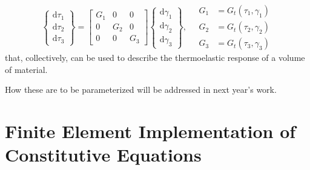 \begin{displaymath}
    \left\{ \begin{matrix}
    \mathrm{d} \tau_1 \\ \mathrm{d} \tau_2 \\ \mathrm{d} \tau_3
    \end{matrix} \right\} = \begin{bmatrix}
    G_1 & 0 & 0 \\ 0 & G_2 & 0 \\ 0 & 0 & G_3
    \end{bmatrix} \left\{ \begin{matrix}
    \mathrm{d} \gamma_1 \\ \mathrm{d} \gamma_2 \\ \mathrm{d} \gamma_3
    \end{matrix} \right\} , \quad
    \begin{aligned}
    G_1 & = G_t ( \tau_1 , \gamma_1 ) \\
    G_2 & = G_t ( \tau_2 , \gamma_2 ) \\
    G_3 & = G_t ( \tau_3 , \gamma_3 )
    \end{aligned}
\end{displaymath}
that, collectively, can be used to describe the thermo\-elastic response of a volume of material.  

How these are to be parameterized will be addressed in next year's work.

\section{Finite Element Implementation of Constitutive Equations}
\label{secFE_CE}

